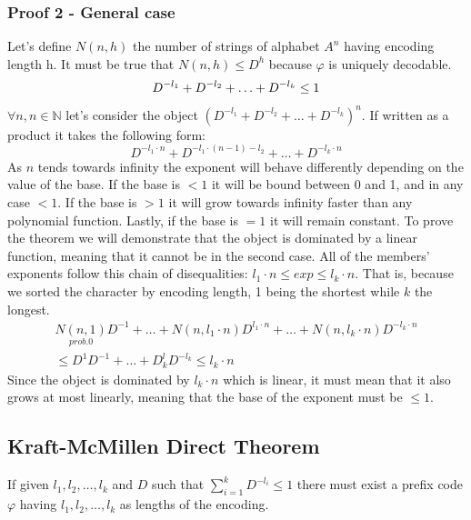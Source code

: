     \subsubsection{Proof 2 - General case}
    Let's define $N(n,h)$ the number of strings of alphabet $A^n$ having encoding length h. It must be true that $N(n,h)\leq D^h$ because $\varphi$ is uniquely decodable.
    \begin{equation}
        D^{-l_1}+D^{-l_2}+\ldots+D^{-l_k}\leq 1 \\
    \end{equation}
    $\forall n, n\in\mathbb{N}$ let's consider the object $(D^{-l_1}+D^{-l_2}+\ldots+D^{-l_k})^n$. If written as a product it takes the following form:
    $$D^{-l_1\cdot n}+D^{-l_1\cdot(n-1)-l_2}+\ldots+D^{-l_k\cdot n}$$
    As $n$ tends towards infinity the exponent will behave differently depending on the value of the base. If the base is $<1$ it will be bound between 0 and 1, and in any case $<1$. If the base is $>1$ it will grow towards infinity faster than any polynomial function. Lastly, if the base is $=1$ it will remain constant. To prove the theorem we will demonstrate that the object is dominated by a linear function, meaning that it cannot be in the second case. 
    All of the members' exponents follow this chain of disequalities: $l_1\cdot n\leq exp\leq l_k\cdot n$. That is, because we sorted the character by encoding length, 1 being the shortest while $k$ the longest.
    \begin{align*}
        \underset{prob. 0}{N(n,1)}D^{-1}+\ldots+N(n,l_1\cdot n)D^{l_1\cdot n}+\ldots+N(n,l_k\cdot n)D^{-l_k\cdot n}\\\leq D^1D^{-1}+\ldots+D^l_kD^{-l_k} \leq l_k\cdot n
    \end{align*}
    Since the object is dominated by $l_k\cdot n$ which is linear, it must mean that it also grows at most linearly, meaning that the base of the exponent must be $\leq 1$.
    \subsection{Kraft-McMillen Direct Theorem}
    If given $l_1,l_2,\ldots,l_k$ and $D$ such that $\sum_{i=1}^{k}{D^{-l_i}}\leq 1$ there must exist a prefix code $\varphi$ having $l_1,l_2,\ldots,l_k$ as lengths of the encoding.
